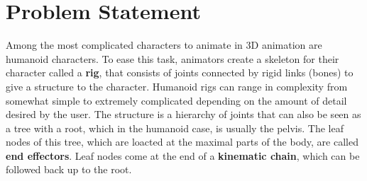\section{Problem Statement}

Among the most complicated characters to animate in 3D animation are humanoid characters. To ease this task, animators create a skeleton for their character called a \textbf{rig}, that consists of joints connected by rigid links (bones) to give a structure to the character. Humanoid rigs can range in complexity from somewhat simple to extremely complicated depending on the amount of detail desired by the user. The structure is a hierarchy of joints that can also be seen as a tree with a root, which in the humanoid case, is usually the pelvis. The leaf nodes of this tree, which are loacted at the maximal parts of the body, are called \textbf{end effectors}. Leaf nodes come at the end of a \textbf{kinematic chain}, which can be followed back up to the root.


